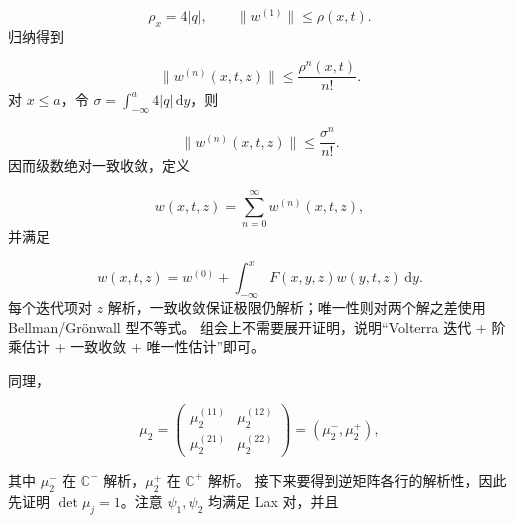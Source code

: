 \documentclass[
    lang=cn,
    scheme=chinese,
    mode=simple,
    device=normal,
    color=blue,
    math=cm,
    thmcnt=section,
    12pt,
    nowatermark
]{elegantbook}
\begin{document}
\begin{callout}
    \begin{equation}
        \rho_x=4\lvert q\rvert,
        \qquad
        \lVert w^{(1)}\rVert\le\rho(x,t).
        \tag{5.2.14}
        \label{eq:5.2.14}
    \end{equation}
    归纳得到

    \begin{equation}
        \lVert w^{(n)}(x,t,z)\rVert
        \le
        \dfrac{\rho^n(x,t)}{n!}.
        \tag{5.2.15}
        \label{eq:5.2.15}
    \end{equation}
    对 $x\le a$，令 $\sigma=\displaystyle\int_{-\infty}^{a}4\lvert q\rvert\,\mathrm dy$，则

    \begin{equation}
        \lVert w^{(n)}(x,t,z)\rVert
        \le
        \dfrac{\sigma^n}{n!}.
        \tag{5.2.16}
        \label{eq:5.2.16}
    \end{equation}
    因而级数绝对一致收敛，定义

    \begin{equation}
        w(x,t,z)
        =
        \sum\limits_{n=0}^{\infty}w^{(n)}(x,t,z),
        \tag{5.2.17}
        \label{eq:5.2.17}
    \end{equation}
    并满足

    \begin{equation}
        w(x,t,z)
        =
        w^{(0)}
        +
        \int_{-\infty}^{x}
        F(x,y,z)w(y,t,z)\,\mathrm dy.
        \tag{5.2.18}
        \label{eq:5.2.18}
    \end{equation}
    每个迭代项对 $z$ 解析，一致收敛保证极限仍解析；唯一性则对两个解之差使用 Bellman/Grönwall 型不等式。
    组会上不需要展开证明，说明``Volterra 迭代 + 阶乘估计 + 一致收敛 + 唯一性估计''即可。
\end{callout}

同理，

\begin{equation}
    \mu_2
    =
    \begin{pmatrix}
        \mu_2^{(11)} & \mu_2^{(12)} \\
        \mu_2^{(21)} & \mu_2^{(22)}
    \end{pmatrix}
    =
    (\mu_2^-,\mu_2^+),
    \tag{5.2.19}
    \label{eq:5.2.19}
\end{equation}

其中 $\mu_2^-$ 在 $\mathbb{C}^-$ 解析，$\mu_2^+$ 在 $\mathbb{C}^+$ 解析。
接下来要得到逆矩阵各行的解析性，因此先证明 $\det\mu_j=1$。注意 $\psi_1,\psi_2$ 均满足 Lax 对，并且
\end{document}
